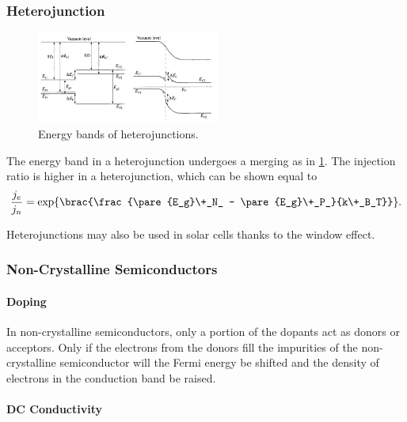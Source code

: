 \documentclass[hidelinks]{article}
\begin{document}

\subsubsection{Heterojunction} %
\label{ssub:heterojunction}

\begin{figure}[ht]
    \centering
    \includegraphics[width=6cm]{src/P-n-heterojunction-formation-Energy-bands-diagram-of-two-different-semiconductors.png}
    \caption{Energy bands of heterojunctions.}
    \label{fig:energy_bands_hetero}
\end{figure}
The energy band in a heterojunction undergoes a merging as in \cref{fig:energy_bands_hetero}. The injection ratio is higher in a heterojunction, which can be shown equal to
\[ \frac{j_e}{j_n} = \exp\brac{\frac{\pare{E_g}\+_N_ - \pare{E_g}\+_P_}{k\+_B_T}}. \]
\par
Heterojunctions may also be used in solar cells thanks to the window effect.


\subsubsection{Non-Crystalline Semiconductors} %
\label{ssub:non_crystalline_semiconductors}

\paragraph{Doping} %
\label{par:doping}

In non-crystalline semiconductors, only a portion of the dopants act as donors or acceptors. Only if the electrons from the donors fill the impurities of the non-crystalline semiconductor will the Fermi energy be shifted and the density of electrons in the conduction band be raised.


\paragraph{DC Conductivity} %
\label{par:dc_conductivity}
\end{document}
